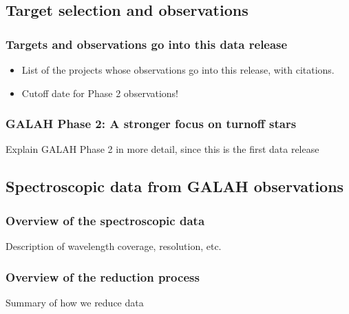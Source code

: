 \documentclass[
  journal=pasa,
  manuscript=research-paper, %
  year=2021,
  volume=37
]{cup-journal}
\begin{document}
\subsection{Target selection and observations} \label{sec:target_selection_observations}

\subsubsection{Targets and observations go into this data release}

\begin{itemize}
    \item List of the projects whose observations go into this release, with citations.
    \item Cutoff date for Phase 2 observations!
\end{itemize}

\subsubsection{GALAH Phase 2: A stronger focus on turnoff stars}

Explain GALAH Phase 2 in more detail, since this is the first data release

\subsection{Spectroscopic data from GALAH observations}
\label{sec:spectroscopic_data_from_galah_observations}

\subsubsection{Overview of the spectroscopic data} \label{sec:overview_spectroscopic_data}

Description of wavelength coverage, resolution, etc.

\subsubsection{Overview of the reduction process}

Summary of how we reduce data
\end{document}

